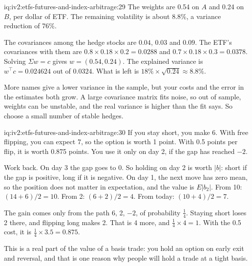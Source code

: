 \begin{solution}{iq:iv2:etfs-futures-and-index-arbitrage:29}
The weights are 0.54 on $A$ and 0.24 on $B$, per dollar of ETF. The remaining volatility is about 8.8\%, a variance reduction of 76\%.

The covariances among the hedge stocks are $0.04$, $0.03$ and $0.09$. The ETF's covariances with them are $0.8 \times 0.18 \times 0.2 = 0.0288$ and $0.7 \times 0.18 \times 0.3 = 0.0378$. Solving $\Sigma w = c$ gives $w = (0.54, 0.24)$. The explained variance is $w^\top c = 0.024624$ out of $0.0324$. What is left is $18\% \times \sqrt{0.24} \approx 8.8\%$.

More names give a lower variance in the sample, but your costs and the error in the estimates both grow. A large covariance matrix fits noise, so out of sample, weights can be unstable, and the real variance is higher than the fit says. So choose a small number of stable hedges.

\end{solution}

\begin{solution}{iq:iv2:etfs-futures-and-index-arbitrage:30}
If you stay short, you make 6. With free flipping, you can expect 7, so the option is worth 1 point. With 0.5 points per flip, it is worth 0.875 points. You use it only on day 2, if the gap has reached $-2$.

Work back. On day 3 the gap goes to 0. So holding on day 2 is worth $|b|$: short if the gap is positive, long if it is negative. On day 1, the next move has zero mean, so the position does not matter in expectation, and the value is $E|b_2|$. From 10: $(14 + 6)/2 = 10$. From 2: $(6 + 2)/2 = 4$. From today: $(10 + 4)/2 = 7$.

The gain comes only from the path 6, 2, $-2$, of probability $\tfrac14$. Staying short loses 2 there, and flipping long makes 2. That is 4 more, and $\tfrac14 \times 4 = 1$. With the 0.5 cost, it is $\tfrac14 \times 3.5 = 0.875$.

This is a real part of the value of a basis trade: you hold an option on early exit and reversal, and that is one reason why people will hold a trade at a tight basis.

\end{solution}

